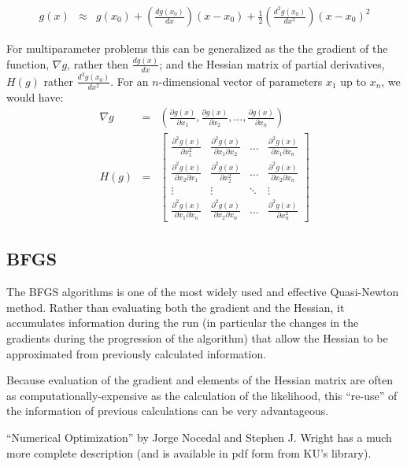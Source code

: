 \documentclass[11pt]{article}
\begin{document}
\begin{eqnarray*}\nonumber
	g(x) & \approx &g(x_0) + \left(\frac{d g(x_0)}{d x}\right)(x-x_0) + \frac{1}{2}\left(\frac{d^2 g(x_0)}{d x^2}\right)(x-x_0)^2
\end{eqnarray*}

For multiparameter problems this can be generalized as the the gradient of the function, $\nabla g$, rather then $\frac{d g(x)}{dx}$; and the Hessian matrix of partial derivatives, $H(g)$ rather $\frac{d^2 g(x_0)}{d x^2}$.
For an $n$-dimensional vector of parameters $x_1$ up to $x_n$, we would have:
\begin{eqnarray*}\nonumber
	\nabla g & = & \left(\frac{\partial g(x)}{\partial x_1}, \frac{\partial g(x)}{\partial x_2},\ldots, \frac{\partial g(x)}{\partial x_n}\right)\\
	H(g) & = & 
\left[
\begin{array}{cccc}
 \frac{\partial^2 g(x)}{\partial x_1^2} & \frac{\partial^2 g(x)}{\partial x_1\partial x_2}  & \ldots &  \frac{\partial^2 g(x)}{\partial x_1\partial x_n} \\
  \frac{\partial^2 g(x)}{\partial x_2\partial x_1} & \frac{\partial^2 g(x)}{\partial x_2^2}  &  \ldots &  \frac{\partial^2 g(x)}{\partial x_2\partial x_n}\\
 \vdots &  \vdots & \ddots  & \vdots\\
  \frac{\partial^2 g(x)}{\partial x_1\partial x_n} &  \frac{\partial^2 g(x)}{\partial x_2\partial x_n}&\ldots & \frac{\partial^2 g(x)}{\partial x_n^2}
\end{array}
\right]
\end{eqnarray*}

\subsection*{BFGS}
The BFGS algorithms is one of the most widely used and effective Quasi-Newton method.  
Rather than evaluating both the gradient and the Hessian, it accumulates information during the run (in particular the changes in the gradients during the progression of the algorithm) that allow the Hessian to be approximated from previously calculated information.

Because evaluation of the gradient and elements of the Hessian matrix are often as computationally-expensive as the calculation of the likelihood, this ``re-use'' of the information of previous calculations can be very advantageous.

``Numerical Optimization'' by Jorge Nocedal and Stephen J. Wright  has a much more complete description (and is available in pdf form from KU's library).
\end{document}
